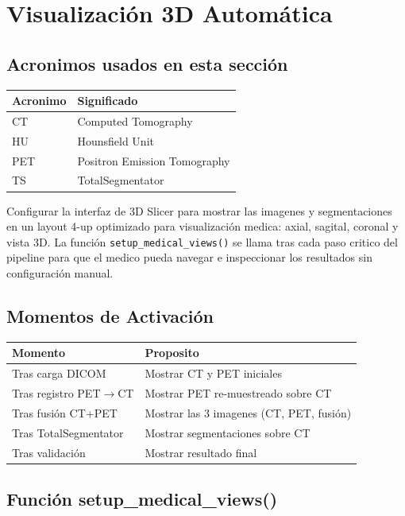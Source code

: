 \documentclass[12pt,a4paper]{article}
\begin{document}
\section{Visualización 3D Automática}
\label{sec:vis}

\subsection*{Acronimos usados en esta sección}
\begin{tabular}{ll}
\toprule
\textbf{Acronimo} & \textbf{Significado} \\
\midrule
CT & Computed Tomography \\
HU & Hounsfield Unit \\
PET & Positron Emission Tomography \\
TS & TotalSegmentator \\
\bottomrule
\end{tabular}

Configurar la interfaz de 3D Slicer para mostrar las imagenes y segmentaciones en un layout
4-up optimizado para visualización medica: axial, sagital, coronal y vista 3D. La función
\texttt{setup\_medical\_views()} se llama tras cada paso critico del pipeline para que el
medico pueda navegar e inspeccionar los resultados sin configuración manual.

\subsection{Momentos de Activación}

\begin{table}[H]
\centering
\begin{tabular}{l l}
\toprule
\textbf{Momento} & \textbf{Proposito} \\
\midrule
Tras carga DICOM & Mostrar CT y PET iniciales \\
Tras registro PET$\to$CT & Mostrar PET re-muestreado sobre CT \\
Tras fusión CT+PET & Mostrar las 3 imagenes (CT, PET, fusión) \\
Tras TotalSegmentator & Mostrar segmentaciones sobre CT \\
Tras validación & Mostrar resultado final \\
\bottomrule
\end{tabular}
\end{table}

\subsection{Función setup\_medical\_views()}
\end{document}
